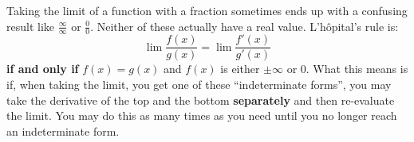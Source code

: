 \documentclass[../revisedmain.tex]{subfiles}
\begin{document}
	Taking the limit of a function with a fraction sometimes ends up with a confusing result like $\displaystyle\frac{\infty}{\infty}$ or $\displaystyle\frac{0}{0}$. Neither of these actually have a real value. L'h\^opital's rule is:$$\lim\frac{f(x)}{g(x)}=\lim\frac{f'(x)}{g'(x)}$$ \textbf{if and only if} $f(x)=g(x)$ and $f(x)$ is either $\pm\infty$ or 0. What this means is if, when taking the limit, you get one of these ``indeterminate forms'', you may take the derivative of the top and the bottom \textbf{separately} and then re-evaluate the limit. You may do this as many times as you need until you no longer reach an indeterminate form.
\end{document}
